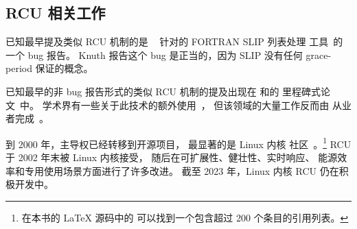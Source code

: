 
\subsection{RCU 相关工作}
\label{sec:defer:RCU Related Work}

已知最早提及类似 RCU 机制的是
~\cite[page 413 of Fundamental Algorithms]{Knuth73}
针对的 FORTRAN SLIP 列表处理
工具~\cite{Weizenbaum:1963:SLP:367593.367617}的一个 bug 报告。
Knuth 报告这个 bug 是正当的，因为 SLIP 没有任何
grace-period 保证的概念。

已知最早的非 bug 报告形式的类似 RCU 机制的提及出现在
和的
里程碑式论文~\cite{Kung80}中。
学术界有一些关于此技术的额外使用~\cite{Manber82,Manber84,BarbaraLiskov1988ArgusCACM,Pugh90,Andrews91textbook,Pu95a,Cowan96a,Rastogi:1997:LPV:645923.671017,Gamsa99}，
但该领域的大量工作反而由
从业者完成~\cite{RichardRashid87a,Hennessy89,Jacobson93,AjuJohn95,Slingwine95,Slingwine97,Slingwine98,McKenney98}。

\QuickQuizEnd

到 2000 年，主导权已经转移到开源项目，
最显著的是 Linux 内核
社区~\cite{RustyRussell2000a,RustyRussell2000b,McKenney01b,McKenney01a,McKenney02a,Arcangeli03}。\footnote{
	在本书的 {\LaTeX} 源码中的 
	可以找到一个包含超过 200 个条目的引用列表。}
RCU 于 2002 年末被 Linux 内核接受，
随后在可扩展性、健壮性、实时响应、
能源效率和专用使用场景方面进行了许多改进。
截至 2023 年，Linux 内核 RCU 仍在积极开发中。

